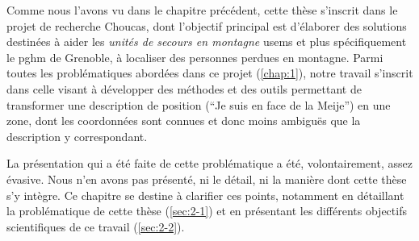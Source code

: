 Comme nous l'avons vu dans le chapitre précédent, cette thèse
s'inscrit dans le projet de recherche Choucas, dont l'objectif
principal est d’élaborer des solutions destinées à aider les
\emph{unités de secours en montagne} \acp{usem} et plus spécifiquement
le \ac{pghm} de Grenoble, à localiser des personnes perdues en
montagne. Parmi toutes les problématiques abordées dans ce projet
(\autoref{chap:1}), notre travail s'inscrit dans celle visant à
développer des méthodes et des outils permettant de transformer une
description de position (\eg \enquote{Je suis en face de la Meije}) en
une zone, dont les coordonnées sont connues et donc moins ambiguës que
la description y correspondant.

La présentation qui a été faite de cette problématique a été,
volontairement, assez évasive. Nous n'en avons pas présenté, ni le
détail, ni la manière dont cette thèse s'y intègre. Ce chapitre se
destine à clarifier ces points, notamment en détaillant la
problématique de cette thèse (\autoref{sec:2-1}) et en présentant les
différents objectifs scientifiques de ce travail (\autoref{sec:2-2}).

